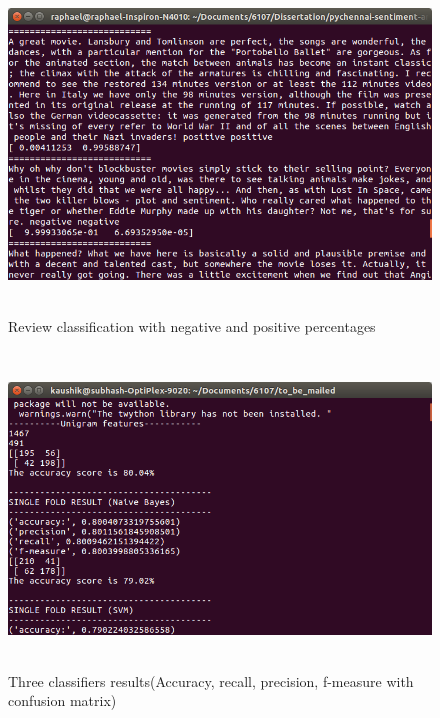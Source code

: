 \documentclass[oneside,a4paper,12pt]{pictreport}
\begin{document}
\begin{figure}[!h]
\includegraphics[width=5.5in,height=3.5in]{screenshot1.png}
\caption{Review classification with negative and positive percentages}
\end{figure}


\begin{figure}[!h]
\includegraphics[width=5.5in,height=3.3in]{screenshot4.png}
\caption{Three classifiers results(Accuracy, recall, precision, f-measure with confusion matrix)}
\end{figure}
\end{document}
